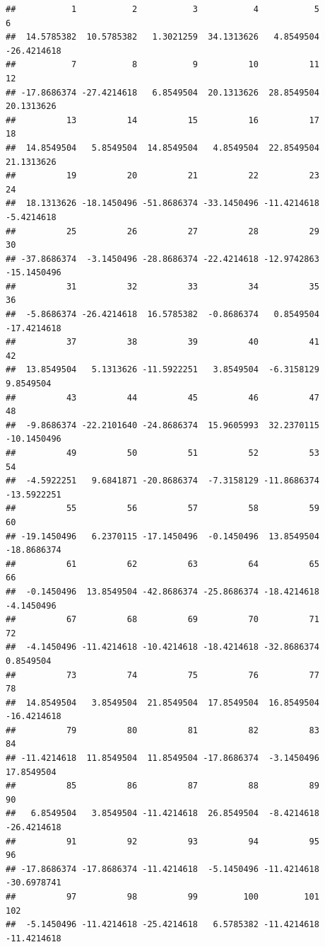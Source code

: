 \documentclass[]{book}
\begin{document}
\begin{verbatim}
##           1           2           3           4           5           6 
##  14.5785382  10.5785382   1.3021259  34.1313626   4.8549504 -26.4214618 
##           7           8           9          10          11          12 
## -17.8686374 -27.4214618   6.8549504  20.1313626  28.8549504  20.1313626 
##          13          14          15          16          17          18 
##  14.8549504   5.8549504  14.8549504   4.8549504  22.8549504  21.1313626 
##          19          20          21          22          23          24 
##  18.1313626 -18.1450496 -51.8686374 -33.1450496 -11.4214618  -5.4214618 
##          25          26          27          28          29          30 
## -37.8686374  -3.1450496 -28.8686374 -22.4214618 -12.9742863 -15.1450496 
##          31          32          33          34          35          36 
##  -5.8686374 -26.4214618  16.5785382  -0.8686374   0.8549504 -17.4214618 
##          37          38          39          40          41          42 
##  13.8549504   5.1313626 -11.5922251   3.8549504  -6.3158129   9.8549504 
##          43          44          45          46          47          48 
##  -9.8686374 -22.2101640 -24.8686374  15.9605993  32.2370115 -10.1450496 
##          49          50          51          52          53          54 
##  -4.5922251   9.6841871 -20.8686374  -7.3158129 -11.8686374 -13.5922251 
##          55          56          57          58          59          60 
## -19.1450496   6.2370115 -17.1450496  -0.1450496  13.8549504 -18.8686374 
##          61          62          63          64          65          66 
##  -0.1450496  13.8549504 -42.8686374 -25.8686374 -18.4214618  -4.1450496 
##          67          68          69          70          71          72 
##  -4.1450496 -11.4214618 -10.4214618 -18.4214618 -32.8686374   0.8549504 
##          73          74          75          76          77          78 
##  14.8549504   3.8549504  21.8549504  17.8549504  16.8549504 -16.4214618 
##          79          80          81          82          83          84 
## -11.4214618  11.8549504  11.8549504 -17.8686374  -3.1450496  17.8549504 
##          85          86          87          88          89          90 
##   6.8549504   3.8549504 -11.4214618  26.8549504  -8.4214618 -26.4214618 
##          91          92          93          94          95          96 
## -17.8686374 -17.8686374 -11.4214618  -5.1450496 -11.4214618 -30.6978741 
##          97          98          99         100         101         102 
##  -5.1450496 -11.4214618 -25.4214618   6.5785382 -11.4214618 -11.4214618 

\end{verbatim}
\end{document}
